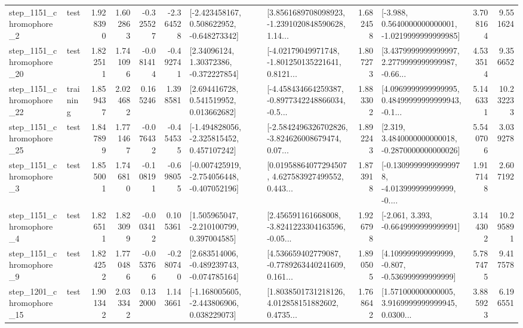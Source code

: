 \begin{tabular}{llrrrrllrlrr}
  step\_1151\_chromophore\_2 &      test &      1.928390 &    1.602863 &     -0.325527 & -2.364528 &   [-2.423458167, 0.508622952, -0.648273342] &  [3.8561689708098923, -1.2391020848590628, 1.14... &       1.682458 &  [-3.988, 0.5640000000000001, -1.0219999999999985] &            3.708164 &          9.551624 \\
 step\_1151\_chromophore\_20 &      test &      1.822511 &    1.741096 &     -0.081414 & -0.492741 &      [2.34096124, 1.30372386, -0.372227854] &  [-4.02179049971748, -1.801250135221641, 0.8121... &       1.807273 &  [3.4379999999999997, 2.2779999999999987, -0.66... &            4.533514 &          9.356652 \\
 step\_1151\_chromophore\_22 &  training &      1.859437 &    2.024682 &      0.165246 &  1.398581 &     [2.694416728, 0.541519952, 0.013662682] &  [-4.458434664259387, -0.8977342248866034, -0.5... &       1.883302 &  [4.0969999999999995, 0.48499999999999943, -0.1... &            5.146331 &         10.232233 \\
 step\_1151\_chromophore\_25 &      test &      1.847899 &    1.771467 &     -0.076432 & -0.454535 &   [-1.494828056, -2.325815452, 0.457107242] &  [-2.5842496326702826, -3.824626008679474, 0.07... &       1.892243 &   [2.319, 3.4840000000000018, -0.2870000000000026] &            5.540706 &          3.039278 \\
  step\_1151\_chromophore\_3 &      test &      1.855001 &    1.746810 &     -0.108191 & -0.698055 &  [-0.007425919, -2.754056448, -0.407052196] &  [0.01958864077294507, 4.627583927499552, 0.443... &       1.873918 &  [-0.13099999999999978, -4.013999999999999, -0.... &            1.917148 &          2.607192 \\
  step\_1151\_chromophore\_4 &      test &      1.826511 &    1.823099 &     -0.003412 &  0.105361 &    [1.505965047, -2.210100799, 0.397004585] &  [2.456591161668008, -3.8241223304163596, -0.05... &       1.926798 &               [-2.061, 3.393, -0.6649999999999991] &            3.144302 &         10.295891 \\
  step\_1151\_chromophore\_9 &      test &      1.824252 &    1.770486 &     -0.053766 & -0.280740 &   [2.683514006, -0.489239743, -0.074785164] &  [4.536659402779087, -0.7789263440241609, 0.161... &       1.890505 &    [4.109999999999999, -0.807, -0.536999999999999] &            5.787475 &          9.417578 \\
 step\_1201\_chromophore\_15 &      test &      1.901342 &    2.033342 &      0.132000 &  1.143661 &   [-1.168005605, -2.443806906, 0.038229073] &  [1.8038501731218126, 4.012858151882602, 0.4735... &       1.768642 &  [1.571000000000005, 3.9169999999999945, 0.0300... &            3.885923 &          6.196551 \\

\end{tabular}
